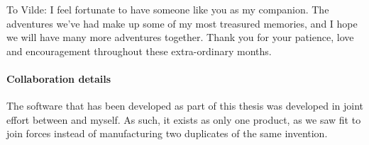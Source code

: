 To Vilde: I feel fortunate to have someone like you as my companion. The adventures we've had make up
some of my most treasured memories, and I hope we will have many more adventures together. Thank you for your 
patience, love and encouragement throughout these extra-ordinary months.

\paragraph{Collaboration details}

The software that has been developed as part of this thesis was developed in joint 
effort between \citeauthor{islandwind2019}\cite{islandwind2019} and myself. As such,
it exists as only one product, as we saw fit to join forces instead of manufacturing two 
duplicates of the same invention.
